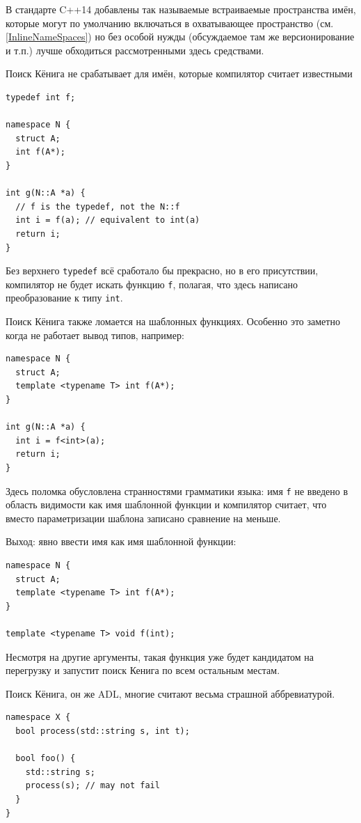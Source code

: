 \documentclass[a4paper,12pt,oneside]{book}
\begin{document}
В стандарте C++14 добавлены так называемые встраиваемые пространства имён, которые могут по умолчанию включаться в охватывающее пространство (см. \ref{InlineNameSpaces}) но без особой нужды (обсуждаемое там же версионирование и т.п.) лучше обходиться рассмотренными здесь средствами.

Поиск Кёнига не срабатывает для имён, которые компилятор считает известными

\begin{lstlisting}
typedef int f;

namespace N {
  struct A;
  int f(A*);
}

int g(N::A *a) {
  // f is the typedef, not the N::f
  int i = f(a); // equivalent to int(a)
  return i;
}
\end{lstlisting}

Без верхнего \lstinline!typedef! всё сработало бы прекрасно, но в его присутствии, компилятор не будет искать функцию \lstinline!f!, полагая, что здесь написано преобразование к типу \lstinline!int!.

Поиск Кёнига также ломается на шаблонных функциях. Особенно это заметно когда не работает вывод типов, например:

\begin{lstlisting}
namespace N {
  struct A;
  template <typename T> int f(A*);
}

int g(N::A *a) {
  int i = f<int>(a);
  return i;
}
\end{lstlisting}

Здесь поломка обусловлена странностями грамматики языка: имя \lstinline!f! не введено в область видимости как имя шаблонной функции и компилятор считает, что вместо параметризации шаблона записано сравнение на меньше.

Выход: явно ввести имя как имя шаблонной функции:

\begin{lstlisting}
namespace N {
  struct A;
  template <typename T> int f(A*);
}

template <typename T> void f(int);
\end{lstlisting}

Несмотря на другие аргументы, такая функция уже будет кандидатом на перегрузку и запустит поиск Кенига по всем остальным местам.

Поиск Кёнига, он же ADL, многие считают весьма страшной аббревиатурой.

\begin{lstlisting}
namespace X {
  bool process(std::string s, int t);
  
  bool foo() {
    std::string s;
    process(s); // may not fail
  }
}
\end{lstlisting}
\end{document}
